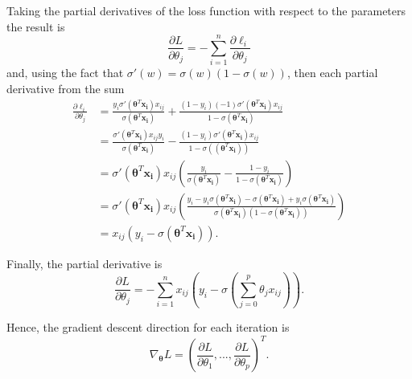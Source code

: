 Taking the partial derivatives of the loss function with respect to the parameters the result is
\begin{equation}
  \frac{\partial L}{\partial \theta_j} = - \sum_{i = 1}^n { \frac{\partial \ell_i}{\partial \theta_j} }
\end{equation}
and, using the fact that $\sigma'(w) = \sigma(w)(1-\sigma(w))$, then each partial derivative from the sum
\begin{equation}
  \begin{split}
    \frac{\partial \ell_i}{\partial \theta_j} & =
    \frac{y_i \sigma'(\boldsymbol{\theta}^T \boldsymbol{x_i}) x_{ij} }  {\sigma(\boldsymbol{\theta}^T \boldsymbol{x_i})} + \frac{(1 - y_i) (-1) \sigma'(\boldsymbol{\theta}^T \boldsymbol{x_i}) x_{ij}} {1 - \sigma(\boldsymbol{\theta}^T \boldsymbol{x_i})} \\
    & = \frac{\sigma'(\boldsymbol{\theta}^T \boldsymbol{x_i}) x_{ij} y_i}{\sigma(\boldsymbol{\theta}^T \boldsymbol{x_i})} - \frac{(1 - y_i) \sigma'(\boldsymbol{\theta}^T \boldsymbol{x_i}) x_{ij}}{1 - \sigma((\boldsymbol{\theta}^T \boldsymbol{x_i}))} \\
    & = \sigma'(\boldsymbol{\theta}^T \boldsymbol{x_i}) x_{ij} \left(\frac{y_i}{\sigma(\boldsymbol{\theta}^T \boldsymbol{x_i})} - \frac{1-y_i}{1-\sigma(\boldsymbol{\theta}^T \boldsymbol{x_i})} \right) \\
    & = \sigma'(\boldsymbol{\theta}^T \boldsymbol{x_i}) x_{ij} \left(\frac{y_i - y_i \sigma(\boldsymbol{\theta}^T \boldsymbol{x_i}) -
    \sigma(\boldsymbol{\theta}^T \boldsymbol{x_i}) + y_i \sigma(\boldsymbol{\theta}^T \boldsymbol{x_i})}{\sigma(\boldsymbol{\theta}^T \boldsymbol{x_i})(1-\sigma(\boldsymbol{\theta}^T \boldsymbol{x_i}))} \right) \\
    & = x_{ij}(y_i - \sigma(\boldsymbol{\theta}^T \boldsymbol{x_i})).
  \end{split}
\end{equation}

Finally, the partial derivative is
\begin{equation}
  \frac{\partial L}{\partial \theta_j} = - \sum_{i = 1}^n { x_{ij}(y_i - \sigma(\sum_{j=0}^{p}{\theta_j x_{ij}})) }.
\end{equation}

Hence, the gradient descent direction for each iteration is
\begin{equation}
  \nabla_{\boldsymbol{\theta}} L = \left( \frac{\partial L}{\partial \theta_1}, ..., \frac{\partial L}{\partial \theta_p} \right)^T.
\end{equation}

